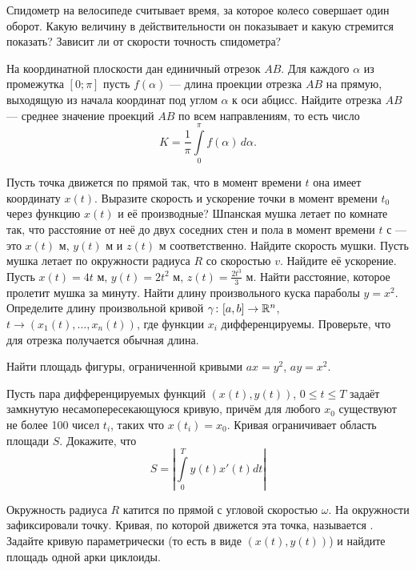 \documentclass[12pt]{article}
\begin{document}


 Спидометр на велосипеде считывает время, за которое колесо совершает один
оборот.
Какую величину в действительности он показывает и какую стремится показать?
Зависит ли от скорости точность спидометра?


На координатной плоскости дан единичный отрезок $AB$.
Для каждого $\alpha$ из промежутка $[0;\pi]$ пусть $f(\alpha)$ ---
длина проекции отрезка $AB$ на прямую, выходящую из начала координат под
углом $\alpha$ к оси абцисс.
Найдите  отрезка $AB$ — среднее значение проекций $AB$
по всем направлениям, то есть число
\vspace*{-3mm}
$$
K=\frac{1}{\pi}\int\limits_0^{\pi}f(\alpha)\, d\alpha.
$$
\vspace*{-3mm}


 Пусть точка движется по прямой так, что в момент времени $t$ она имеет координату $x(t)$.
Выразите скорость и ускорение точки в момент времени $t_0$ через функцию $x(t)$ и её производные?
 Шпанская мушка летает по комнате так, что расстояние от неё до двух соседних стен
и пола  в момент времени $t$ с --- это $x(t)$ м, $y(t)$ м и $z(t)$ м соответственно. Найдите скорость мушки.
 Пусть мушка летает по окружности радиуса $R$ со скоростью $v$. Найдите её ускорение.
 Пусть $x(t) = 4t$ м, $y(t) = 2t^2$ м, $z(t) = \frac{2t^3}{3}$ м. Найти расстояние, которое пролетит мушка за минуту.
 Найти длину произвольного куска параболы $y=x^2$.
 Определите длину произвольной кривой $\gamma \colon [a,b] \rightarrow \mathbb{R}^n$, $t \to (x_1(t),\ldots,x_n(t))$, где функции $x_i$ дифференцируемы. Проверьте, что для отрезка получается обычная длина.


Найти площадь фигуры, ограниченной кривыми $ax = y^2$, $ay=x^2$.

 Пусть пара дифференцируемых функций $(x(t),y(t))$, $0\leqslant t \leqslant T$ задаёт замкнутую
несамопересекающуюся кривую, причём для любого $x_0$ существуют не более 100
чисел $t_i$, таких что $x(t_i) = x_0$. Кривая ограничивает область площади $S$.
Докажите, что
$$S = \left| \int\limits_0^T y(t) x'(t) dt \right|$$

Окружность радиуса $R$ катится по прямой с угловой скоростью $\omega$. На окружности зафиксировали точку. Кривая, по которой движется эта точка, называется . Задайте кривую параметрически (то есть в виде $(x(t),y(t))$) и найдите площадь одной арки циклоиды.
\end{document}

